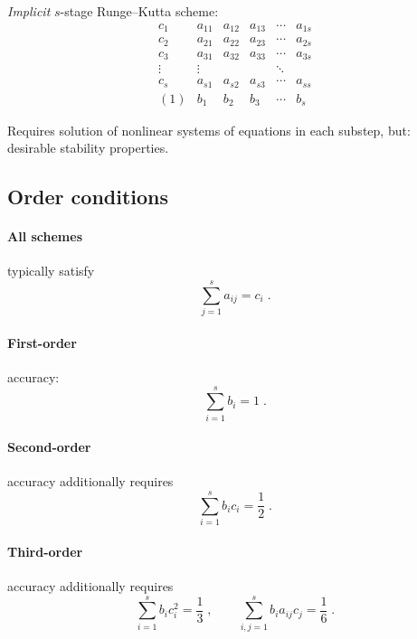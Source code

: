 \documentclass[\mydriver,12pt,twoside,notitlepage]{article}
\newcommand{\ColEmph}[1]{{\color{DarkishRed}#1}}
\begin{document}
\emph{Implicit} $s$-stage Runge--Kutta scheme:
\begin{equation}
  \begin{array}{c|ccccc}
    c_1    & a_{11} & a_{12} & a_{13} & \cdots & a_{1s} \\
    c_2    & a_{21} & a_{22} & a_{23} & \cdots & a_{2s} \\
    c_3    & a_{31} & a_{32} & a_{33} & \cdots & a_{3s} \\
    \vdots & \vdots &        &        & \ddots &        \\
    c_s    & a_{s1} & a_{s2} & a_{s3} & \cdots & a_{ss} \\
    \hline
    (1)    & b_1    & b_2    & b_3    & \cdots & b_s
  \end{array}
\end{equation}

Requires solution of nonlinear systems of equations in each substep,
\ColEmph{but}: desirable stability properties.

\clearpage

\subsection{Order conditions}

%
\paragraph{All schemes} typically satisfy
\begin{equation}
  \sum\limits_{j=1}^{s} a_{ij} = c_i \; .
\end{equation}
%
\paragraph{First-order} accuracy:
\begin{equation}
  \sum\limits_{i=1}^{s} b_{i} = 1 \; .  
\end{equation}

%
\paragraph{Second-order} accuracy additionally requires
\begin{equation}
  \sum\limits_{i=1}^{s} b_{i} c_i = \dfrac{1}{2} \; .  
\end{equation}

%
\paragraph{Third-order} accuracy additionally requires
\begin{equation}
  \sum\limits_{i=1}^{s} b_{i} c_i^2        = \dfrac{1}{3} \; ,
  \qquad
  \sum\limits_{i,j=1}^{s} b_{i} a_{ij} c_j = \dfrac{1}{6} \; .  
\end{equation}
\end{document}
